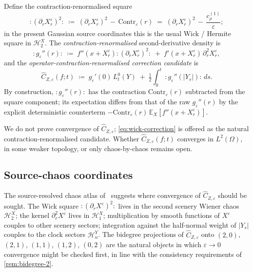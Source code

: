 \documentclass[11pt,reqno]{amsart}
\theoremstyle{plain}
\theoremstyle{definition}
\theoremstyle{remark}
\newcommand{\E}{\mathbb{E}}
\newcommand{\Hilb}{\mathcal{H}}
\newcommand{\IBM}{Z}
\begin{document}
Define the contraction-renormalised square
\begin{equation}\label{eq:wick-sq}
  :(\partial_rX^\varepsilon_r)^{2}:\;\coloneqq\;
  (\partial_rX^\varepsilon_r)^{2}\,-\,\mathrm{Contr}_\varepsilon(r)
  \;=\;(\partial_rX^\varepsilon_r)^{2}\,-\,\frac{c_\rho^{(1)}}{\varepsilon};
\end{equation}
in the present Gaussian source coordinates this is the usual
Wick / Hermite square in $\Hilb_2^{X}$. The
\emph{contraction-renormalised} second-derivative density is
\begin{equation}\label{eq:wick-g}
  :g_\varepsilon''(r):\;\coloneqq\;
   f''(x+X^\varepsilon_r):(\partial_rX^\varepsilon_r)^{2}:
   \;+\;f'(x+X^\varepsilon_r)\,\partial_r^{2}X^\varepsilon_r,
\end{equation}
and the \emph{operator-contraction-renormalised correction candidate}
is
\begin{equation}\label{eq:wick-correction}
  \widehat C_{\IBM,\varepsilon}(f;t)
  \;\coloneqq\;
   g_\varepsilon'(0)\,L_t^{0}(Y)\;+\;\tfrac12\!\int_0^t\,
   :g_\varepsilon''(|Y_s|):\,ds.
\end{equation}
By construction, $:g_\varepsilon''(r):$ has the contraction
$\mathrm{Contr}_\varepsilon(r)$ subtracted from the square component;
its expectation differs from that of the raw $g_\varepsilon''(r)$ by the
explicit deterministic counterterm
$-\mathrm{Contr}_\varepsilon(r)\,\E_X[f''(x+X^\varepsilon_r)]$.

We do not prove convergence of $\widehat C_{\IBM,\varepsilon}$;
\eqref{eq:wick-correction} is offered as the natural
contraction-renormalised candidate. Whether
$\widehat C_{\IBM,\varepsilon}(f;t)$ converges in $L^{2}(\Omega)$, in
some weaker topology, or only chaos-by-chaos remains open.

\subsection*{Source-chaos coordinates}

The source-resolved chaos atlas of~\cite{Fontes-IBMchaos} suggests
where convergence of $\widehat C_{\IBM,\varepsilon}$ should be sought.
The Wick square $:(\partial_rX^\varepsilon)^{2}:$ lives in the second
scenery Wiener chaos $\Hilb^{X}_{2}$; the kernel
$\partial_r^{2}X^\varepsilon$ lives in $\Hilb^{X}_{1}$; multiplication
by smooth functions of $X^\varepsilon$ couples to other scenery
sectors; integration against the half-normal weight of $|Y_s|$ couples
to the clock sectors $\Hilb^{Y}_{n}$. The bidegree projections of
$\widehat C_{\IBM,\varepsilon}$ onto $(2,0)$, $(2,1)$, $(1,1)$,
$(1,2)$, $(0,2)$ are the natural objects in which
$\varepsilon\to 0$ convergence might be checked first, in line with
the consistency requirements of \cref{rem:bidegree-2}.
\end{document}
